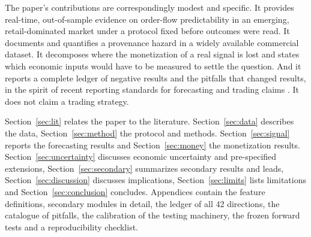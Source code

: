 The paper's contributions are correspondingly modest and specific. It provides real-time, out-of-sample evidence on order-flow predictability in an emerging, retail-dominated market under a protocol fixed before outcomes were read. It documents and quantifies a provenance hazard in a widely available commercial dataset. It decomposes where the monetization of a real signal is lost and states which economic inputs would have to be measured to settle the question. And it reports a complete ledger of negative results and the pitfalls that changed results, in the spirit of recent reporting standards for forecasting and trading claims \citep{khushi2026}. It does not claim a trading strategy.

Section~\ref{sec:lit} relates the paper to the literature. Section~\ref{sec:data} describes the data, Section~\ref{sec:method} the protocol and methods. Section~\ref{sec:signal} reports the forecasting results and Section~\ref{sec:money} the monetization results. Section~\ref{sec:uncertainty} discusses economic uncertainty and pre-specified extensions, Section~\ref{sec:secondary} summarizes secondary results and leads, Section~\ref{sec:discussion} discusses implications, Section~\ref{sec:limits} lists limitations and Section~\ref{sec:conclusion} concludes. Appendices contain the feature definitions, secondary modules in detail, the ledger of all 42 directions, the catalogue of pitfalls, the calibration of the testing machinery, the frozen forward tests and a reproducibility checklist.
